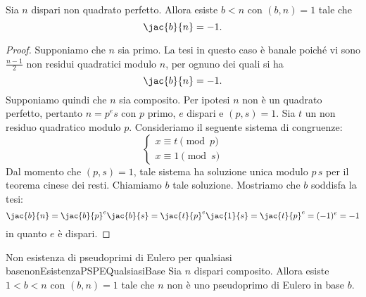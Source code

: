 	\begin{lem}
	Sia \(n\) dispari non quadrato perfetto.
	Allora esiste \(b<n\) con \((b,n)=1\) tale che
		\[
		\jac{b}{n} = -1.
		\]
	\end{lem}

	\begin{proof}
	Supponiamo che \(n\) sia primo.
	La tesi in questo caso è banale poiché vi sono \(\frac{n-1}{2}\) non residui quadratici modulo \(n\), per ognuno dei quali si ha
		\[
		\jac{b}{n} = -1.
		\]
	Supponiamo quindi che \(n\) sia composito.
	Per ipotesi \(n\) non è un quadrato perfetto, pertanto \(n=p^e s\) con \(p\) primo, \(e\) dispari e \((p,s)=1\).
	Sia \(t\) un non residuo quadratico modulo \(p\).
	Consideriamo il seguente sistema di congruenze:
		\[
		\begin{cases}
		x \equiv t \pmod{p}\\
		x \equiv 1 \pmod{s}
		\end{cases}
		\]
	Dal momento che \((p,s)=1\), tale sistema ha soluzione unica modulo \(p\,s\) per il teorema cinese dei resti. Chiamiamo \(b\) tale soluzione.
	Mostriamo che \(b\) soddisfa la tesi:
		\[
		\jac{b}{n} = \jac{b}{p}^e \jac{b}{s} = \jac{t}{p}^e \jac{1}{s} = \jac{t}{p}^e = (-1)^e = -1
		\]
	in quanto \(e\) è dispari.
	\end{proof}

	\begin{prop}{Non esistenza di pseudoprimi di Eulero per qualsiasi base}{nonEsistenzaPSPEQualsiasiBase}
	Sia \(n\) dispari composito.
	Allora esiste \(1<b<n\) con \((b,n)=1\) tale che \(n\) non è uno pseudoprimo di Eulero in base \(b\).
	\end{prop}

